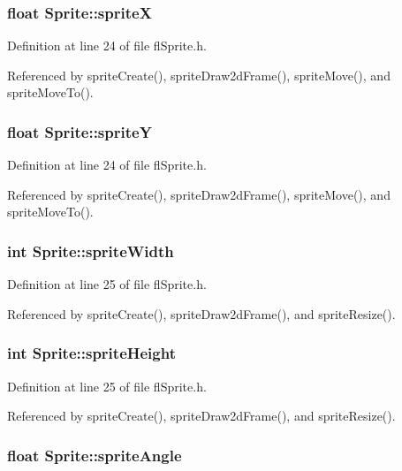 \subsubsection{\setlength{\rightskip}{0pt plus 5cm}float {\bf Sprite::sprite\-X}}\label{structSprite_48726b940c261bc1f78f8be571726bd7}




Definition at line 24 of file fl\-Sprite.h.

Referenced by sprite\-Create(), sprite\-Draw2d\-Frame(), sprite\-Move(), and sprite\-Move\-To().
\subsubsection{\setlength{\rightskip}{0pt plus 5cm}float {\bf Sprite::sprite\-Y}}\label{structSprite_8c8ff7035bed89eb35b742d5e75dab66}




Definition at line 24 of file fl\-Sprite.h.

Referenced by sprite\-Create(), sprite\-Draw2d\-Frame(), sprite\-Move(), and sprite\-Move\-To().
\subsubsection{\setlength{\rightskip}{0pt plus 5cm}int {\bf Sprite::sprite\-Width}}\label{structSprite_8e97080424e115ddd940ab0a74b201e6}




Definition at line 25 of file fl\-Sprite.h.

Referenced by sprite\-Create(), sprite\-Draw2d\-Frame(), and sprite\-Resize().
\subsubsection{\setlength{\rightskip}{0pt plus 5cm}int {\bf Sprite::sprite\-Height}}\label{structSprite_71954ce7238ae170b4fd9fadca01a926}




Definition at line 25 of file fl\-Sprite.h.

Referenced by sprite\-Create(), sprite\-Draw2d\-Frame(), and sprite\-Resize().
\subsubsection{\setlength{\rightskip}{0pt plus 5cm}float {\bf Sprite::sprite\-Angle}}\label{structSprite_9d921481bcfd192dbbe694aa03e97081}




